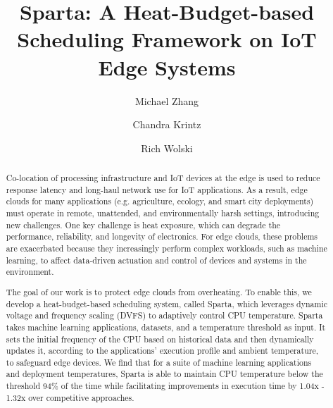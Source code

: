 \documentclass[runningheads]{llncs}
\begin{document}
%

\title{Sparta: A Heat-Budget-based Scheduling Framework on IoT Edge Systems}

%
%


\author{Michael Zhang \and
Chandra Krintz \and
Rich Wolski}


%
\maketitle              %
%


\begin{abstract}
Co-location of processing infrastructure and IoT devices at the edge is used to reduce response latency and long-haul network use for IoT applications. As a result, edge clouds for many applications (e.g. agriculture, ecology, and smart city deployments) must operate in remote, unattended, and environmentally harsh settings, introducing new challenges. One key challenge is heat exposure, which can degrade the performance, reliability, and longevity of electronics. For edge clouds, these problems are exacerbated because they increasingly perform complex workloads, such as machine learning, to affect data-driven actuation and control of devices and systems in the environment.

\vspace{0.08in}
The goal of our work is to protect edge clouds from overheating. To enable this, we develop a heat-budget-based scheduling system, called Sparta, which leverages dynamic voltage and frequency scaling (DVFS) to adaptively control CPU temperature. Sparta takes machine learning applications, datasets, and a temperature threshold as input. It sets the initial frequency of the CPU based on historical data and then dynamically updates it, according to the applications' execution profile and ambient temperature, to safeguard edge devices. We find that for a suite of machine learning applications and deployment temperatures, Sparta is able to maintain CPU temperature below the threshold 94\% of the time while facilitating improvements in execution time by 1.04x - 1.32x over competitive approaches.


\end{abstract}
%
%
%
\end{document}

